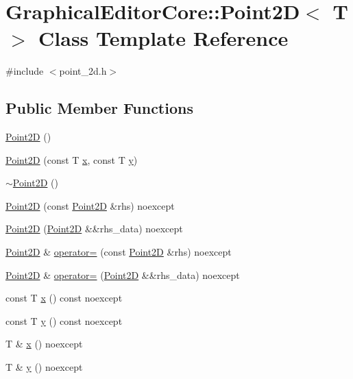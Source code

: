 \hypertarget{classGraphicalEditorCore_1_1Point2D}{}\section{Graphical\+Editor\+Core\+:\+:Point2D$<$ T $>$ Class Template Reference}
\label{classGraphicalEditorCore_1_1Point2D}


{\ttfamily \#include $<$point\+\_\+2d.\+h$>$}

\subsection*{Public Member Functions}
\begin{DoxyCompactItemize}
\item 
\hyperlink{classGraphicalEditorCore_1_1Point2D_af864ab3bd329e890d433150985361135}{Point2D} ()
\item 
\hyperlink{classGraphicalEditorCore_1_1Point2D_aa4098323182170badd0e891c4f2d6a71}{Point2D} (const T \hyperlink{classGraphicalEditorCore_1_1Point2D_a3535507204fc7a8f6470942de5a7643d}{x}, const T \hyperlink{classGraphicalEditorCore_1_1Point2D_a902aa76be515d1f55ee733265ad48dcd}{y})
\item 
\hyperlink{classGraphicalEditorCore_1_1Point2D_a0afd645c9cdf5ce145f9038fc0769831}{$\sim$\+Point2D} ()
\item 
\hyperlink{classGraphicalEditorCore_1_1Point2D_ac3b92920bcb4164d8a531d1dfe318226}{Point2D} (const \hyperlink{classGraphicalEditorCore_1_1Point2D}{Point2D} \&rhs) noexcept
\item 
\hyperlink{classGraphicalEditorCore_1_1Point2D_aad9a07fd929803c6922929c37ac0a99b}{Point2D} (\hyperlink{classGraphicalEditorCore_1_1Point2D}{Point2D} \&\&rhs\+\_\+data) noexcept
\item 
\hyperlink{classGraphicalEditorCore_1_1Point2D}{Point2D} \& \hyperlink{classGraphicalEditorCore_1_1Point2D_a906bd43d6cab87226826a685f0a3c939}{operator=} (const \hyperlink{classGraphicalEditorCore_1_1Point2D}{Point2D} \&rhs) noexcept
\item 
\hyperlink{classGraphicalEditorCore_1_1Point2D}{Point2D} \& \hyperlink{classGraphicalEditorCore_1_1Point2D_a0616c17f7808bbb1035c5dac3b7cd123}{operator=} (\hyperlink{classGraphicalEditorCore_1_1Point2D}{Point2D} \&\&rhs\+\_\+data) noexcept
\item 
const T \hyperlink{classGraphicalEditorCore_1_1Point2D_a3535507204fc7a8f6470942de5a7643d}{x} () const noexcept
\item 
const T \hyperlink{classGraphicalEditorCore_1_1Point2D_a902aa76be515d1f55ee733265ad48dcd}{y} () const noexcept
\item 
T \& \hyperlink{classGraphicalEditorCore_1_1Point2D_a0768ab4b5b5bd50bd65b7e1b3138c91a}{x} () noexcept
\item 
T \& \hyperlink{classGraphicalEditorCore_1_1Point2D_a2924163075e65a55e457989c36f792e4}{y} () noexcept
\end{DoxyCompactItemize}



